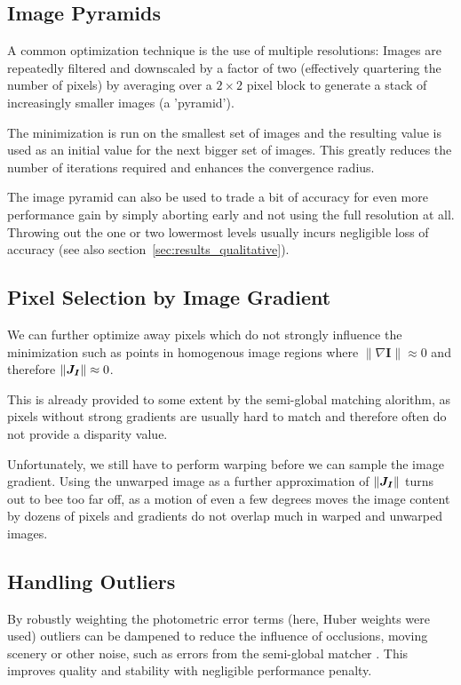 \subsection{Image Pyramids}
\label{sec:pyramids}

A common optimization technique is the use of multiple resolutions: Images are
repeatedly filtered and downscaled by a factor of two (effectively quartering
the number of pixels) by averaging over a $2 \times 2$ pixel block to generate
a stack of increasingly smaller images (a 'pyramid').

The minimization is run on the smallest set of images and the resulting value
is used as an initial value for the next bigger set of images.
This greatly reduces the number of iterations required and enhances the
convergence radius.

The image pyramid can also be used to trade a bit of accuracy for even more
performance gain by simply aborting early and not using the full resolution at
all. Throwing out the one or two lowermost levels usually incurs negligible
loss of accuracy (see also section~\ref{sec:results_qualitative}).


\subsection{Pixel Selection by Image Gradient}
\label{sec:gradient_filtering}

We can further optimize away pixels which do not strongly influence the
minimization such as points in homogenous image regions where $\lVert \nabla
\mathbf{I} \rVert \approx 0$ and therefore $\lVert \mat{J_I} \rVert \approx 0$.

This is already provided to some extent by the semi-global matching alorithm,
as pixels without strong gradients are usually hard to match and therefore often
do not provide a disparity value.

Unfortunately, we still have to perform warping before we can sample the image
gradient. Using the unwarped image as a further approximation of $\lVert
\mat{J_I} \rVert$ turns out to bee too far off, as a motion of even a few
degrees moves the image content by dozens of pixels and gradients do not
overlap much in warped and unwarped images.

\subsection{Handling Outliers}

By robustly weighting the photometric error terms (here, Huber weights were
used) outliers can be dampened to reduce the influence of occlusions, moving
scenery or other noise, such as errors from the semi-global matcher
\cite{comport2007odometry}. This improves quality and stability with negligible
performance penalty.

